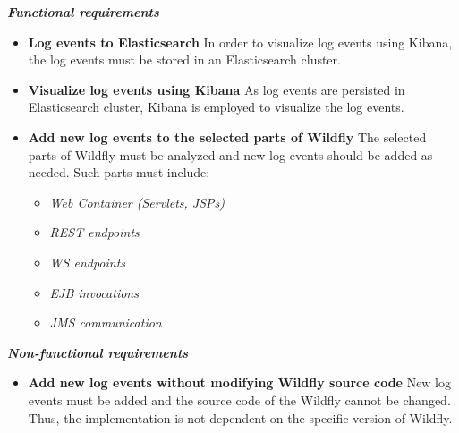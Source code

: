 \documentclass[12pt,oneside]{fithesis2}
\begin{document}
\noindent
\newline
\textit{\textbf{Functional requirements}}
\begin{itemize}
	\item \textbf{Log events to Elasticsearch} \newline
	In order to visualize log events using Kibana, the log events must be stored in an Elasticsearch cluster.
	\item \textbf{Visualize log events using Kibana} \newline
	As log events are persisted in Elasticsearch cluster, Kibana is employed to visualize the log events.
	\item \textbf{Add new log events to the selected parts of Wildfly}  \newline
	The selected parts of Wildfly must be analyzed and new log events should be added as needed. Such parts must include:
	 \begin{itemize}
	 	\item \textit{Web Container (Servlets, JSPs)}
	 	\item \textit{REST endpoints}
	 	\item \textit{WS endpoints}
	 	\item \textit{EJB invocations}
	 	\item \textit{JMS communication}
	 \end{itemize}
\end{itemize}

\noindent
\textit{\textbf{Non-functional requirements}}
\begin{itemize}
	\item \textbf{Add new log events without modifying Wildfly source code} \newline
	New log events must be added and the source code of the Wildfly cannot be changed. Thus, the implementation is not dependent on the specific version of Wildfly.
\end{itemize}
\end{document}
